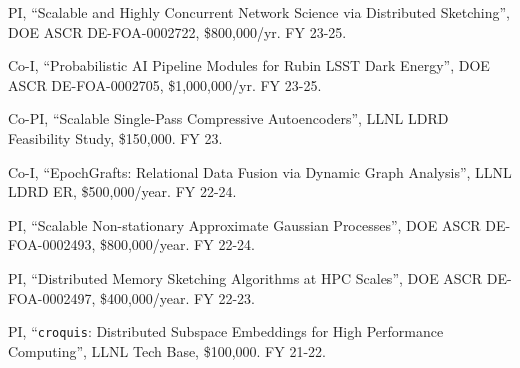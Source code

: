 \begin{innerlist}

  \item PI,
  ``Scalable and Highly Concurrent Network Science via Distributed Sketching'',
  DOE ASCR DE-FOA-0002722,
  \$800,000/yr.
  FY 23-25.

  \item Co-I,
  ``Probabilistic AI Pipeline Modules for Rubin LSST Dark Energy'',
  DOE ASCR DE-FOA-0002705,
  \$1,000,000/yr.
  FY 23-25.

  \item Co-PI,
  ``Scalable Single-Pass Compressive Autoencoders'',
  LLNL LDRD Feasibility Study,
  \$150,000.
  FY 23.

  \item Co-I,
  ``EpochGrafts: Relational Data Fusion via Dynamic Graph Analysis'',
  LLNL LDRD ER,
  \$500,000/year.
  FY 22-24.

  \item PI,
  ``Scalable Non-stationary Approximate Gaussian Processes'',
  DOE ASCR DE-FOA-0002493,
  \$800,000/year.
  FY 22-24.

  \item PI,
  ``Distributed Memory Sketching Algorithms at HPC Scales'',
  DOE ASCR DE-FOA-0002497,
  \$400,000/year.
  FY 22-23.

  \item PI,
  ``\texttt{croquis}: Distributed Subspace Embeddings for High Performance Computing'',
  LLNL Tech Base,
  \$100,000.
  FY 21-22.

\end{innerlist}